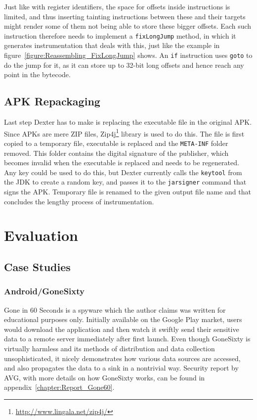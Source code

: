 \documentclass[12pt,twoside,notitlepage]{report}
\begin{document}
Just like with register identifiers, the space for offsets inside instructions is limited, and thus inserting tainting instructions between these and their targets might render some of them not being able to store these bigger offsets. Each such instruction therefore needs to implement a \verb$fixLongJump$ method, in which it generates instrumentation that deals with this, just like the example in figure~\ref{figure:Reassembling_FixLongJump} shows. An \verb$if$ instruction uses \verb$goto$ to do the jump for it, as it can store up to 32-bit long offsets and hence reach any point in the bytecode. 

\section{APK Repackaging}

Last step Dexter has to make is replacing the executable file in the original APK. Since APKs are mere ZIP files, Zip4j\footnote{\scriptsize\url{http://www.lingala.net/zip4j/}} library is used to do this. The file is first copied to a temporary file, executable is replaced and the \verb$META-INF$ folder removed. This folder contains the digital signature of the publisher, which becomes invalid when the executable is replaced and needs to be regenerated. Any key could be used to do this, but Dexter currently calls the \verb$keytool$ from the JDK to create a random key, and passes it to the \verb$jarsigner$ command that signs the APK. Temporary file is renamed to the given output file name and that concludes the lengthy process of instrumentation.

\cleardoublepage
\chapter{Evaluation}

\section{Case Studies}

\subsection{Android/GoneSixty}

Gone in 60 Seconds is a spyware which the author claims was written for educational purposes only. Initially available on the Google Play market, users would download the application and then watch it swiftly send their sensitive data to a remote server immediately after first launch. Even though GoneSixty is virtually harmless and its methods of distribution and data collection unsophisticated, it nicely demonstrates how various data sources are accessed, and also propagates the data to a sink in a nontrivial way. Security report by AVG, with more details on how GoneSixty works, can be found in appendix~\ref{chapter:Report_Gone60}.
\end{document}
